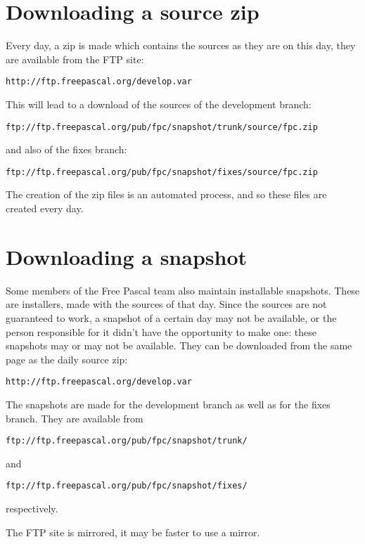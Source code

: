 \section{Downloading a source zip}
Every day, a zip is made which contains the sources as they are on this day,
they are available from the FTP site:
\begin{verbatim}
http://ftp.freepascal.org/develop.var
\end{verbatim}
This will lead to a download of the sources of the development branch:
\begin{verbatim}
ftp://ftp.freepascal.org/pub/fpc/snapshot/trunk/source/fpc.zip
\end{verbatim}
and also of the fixes branch:
\begin{verbatim}
ftp://ftp.freepascal.org/pub/fpc/snapshot/fixes/source/fpc.zip
\end{verbatim}
The creation of the zip files is an automated process, and so these files 
are created every day.

\section{Downloading a snapshot}
Some members of the Free Pascal team also maintain installable snapshots.
These are installers, made with the sources of that day. Since the sources
are not guaranteed to work, a snapshot of a certain day may not be
available, or the person responsible for it didn't have the opportunity to
make one: these snapshots may or may not be available. They can be
downloaded from the same page as the daily source zip:
\begin{verbatim}
http://ftp.freepascal.org/develop.var
\end{verbatim}
The snapshots are made for the development branch as well as for the fixes
branch. They are available from
\begin{verbatim}
ftp://ftp.freepascal.org/pub/fpc/snapshot/trunk/
\end{verbatim}
and
\begin{verbatim}
ftp://ftp.freepascal.org/pub/fpc/snapshot/fixes/
\end{verbatim}
respectively.

The FTP site is mirrored, it may be faster to use a mirror.


